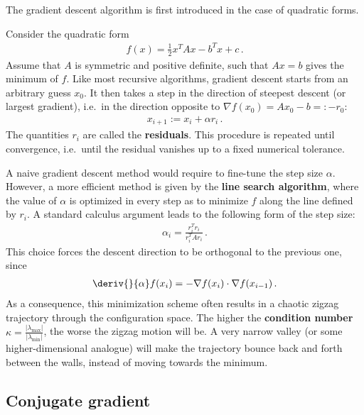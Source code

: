     The gradient descent algorithm is first introduced in the case of quadratic forms.
    \begin{method}
        Consider the quadratic form
        \begin{gather}
            f(x) = \frac{1}{2}x^TAx - b^Tx + c\,.
        \end{gather}
        Assume that $A$ is symmetric and positive definite, such that $Ax=b$ gives the minimum of $f$. Like most recursive algorithms, gradient descent starts from an arbitrary guess $x_0$. It then takes a step in the direction of steepest descent (or largest gradient), i.e.~in the direction opposite to $\nabla f(x_0) = Ax_0-b =: -r_0$:
        \begin{gather}
            x_{i+1} := x_i + \alpha r_i\,.
        \end{gather}
        The quantities $r_i$ are called the \textbf{residuals}. This procedure is repeated until convergence, i.e.~until the residual vanishes up to a fixed numerical tolerance.

        A naive gradient descent method would require to fine-tune the step size $\alpha$. However, a more efficient method is given by the \textbf{line search algorithm}, where the value of $\alpha$ is optimized in every step as to minimize $f$ along the line defined by $r_i$. A standard calculus argument leads to the following form of the step size:
        \begin{gather}
            \alpha_i = \frac{r_i^Tr_i}{r_i^TAr_i}\,.
        \end{gather}
        This choice forces the descent direction to be orthogonal to the previous one, since
        \begin{gather}
            \deriv{}{\alpha}f(x_i) = -\nabla f(x_i)\cdot\nabla f(x_{i-1})\,.
        \end{gather}
        As a consequence, this minimization scheme often results in a chaotic zigzag trajectory through the configuration space. The higher the \textbf{condition number} $\kappa=\frac{|\lambda_{\max}|}{|\lambda_{\min}|}$, the worse the zigzag motion will be. A very narrow valley (or some higher-dimensional analogue) will make the trajectory bounce back and forth between the walls, instead of moving towards the minimum.
    \end{method}

\subsection{Conjugate gradient}

